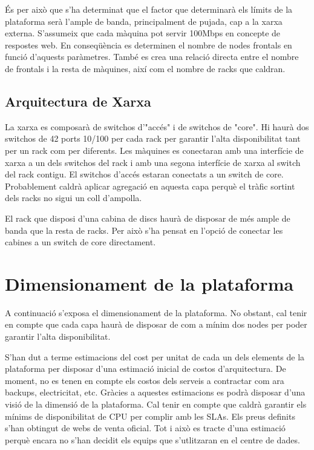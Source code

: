 \documentclass[a4paper, 11pt]{article}
\begin{document}
És per això que s'ha determinat que el factor que determinarà els límits de la plataforma serà l'ample de banda, principalment de pujada, cap a la xarxa externa. S'assumeix que cada màquina pot servir 100Mbps en concepte de respostes web. En conseqüència es determinen el nombre de nodes frontals en funció d'aquests paràmetres. També es crea una relació directa entre el nombre de frontals i la resta de màquines, així com el nombre de racks que caldran. 


\subsection{Arquitectura de Xarxa}

La xarxa es composarà de switchos d'"accés" i de switchos de "core". Hi haurà dos switchos de 42 ports 10/100 per cada rack per garantir l'alta disponibilitat tant per un rack com per diferents. Les màquines es conectaran amb una interfície de xarxa a un dels switchos del rack i amb una segona interfície de xarxa al switch del rack contigu. El switchos d'accés estaran conectats a un switch de core. Probablement caldrà aplicar agregació en aquesta capa perquè el tràfic sortint dels racks no sigui un coll d'ampolla. 

El rack que disposi d'una cabina de discs haurà de disposar de més ample de banda que la resta de racks. Per això s'ha pensat en l'opció de  conectar les cabines a un switch de core directament. 

\section{Dimensionament de la plataforma}
A continuació s'exposa el dimensionament de la plataforma. No obstant, cal tenir en compte que cada capa haurà de disposar de com a mínim dos nodes per poder garantir l'alta disponibilitat.

S'han dut a terme estimacions del cost per unitat de cada un dels elements de la plataforma per disposar d'una estimació inicial de costos d'arquitectura. De moment, no es tenen en compte els costos dels serveis a contractar com ara backups, electricitat, etc. 
Gràcies a aquestes estimacions es podrà disposar d'una visió de la dimensió de la plataforma. Cal tenir en compte que caldrà garantir els mínims de disponibilitat de CPU per complir amb les SLAs. Els preus definits s'han obtingut de webs de venta oficial. Tot i això es tracte d'una estimació perquè encara no s'han decidit els equips que s'utlitzaran en el centre de dades.
\end{document}
